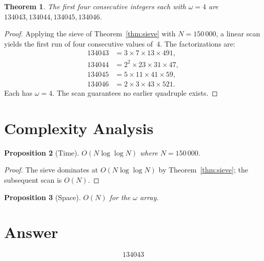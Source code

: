 \documentclass[12pt]{article}
\newtheorem{theorem}{Theorem}
\newtheorem{proposition}[theorem]{Proposition}
\begin{document}
\begin{theorem}\label{thm:answer}
The first four consecutive integers each with $\omega = 4$ are $134043, 134044, 134045, 134046$.
\end{theorem}

\begin{proof}
Applying the sieve of Theorem~\ref{thm:sieve} with $N = 150\,000$, a linear scan yields the first run of four consecutive values of~$4$. The factorizations are:
\begin{align*}
134043 &= 3 \times 7 \times 13 \times 491, \\
134044 &= 2^2 \times 23 \times 31 \times 47, \\
134045 &= 5 \times 11 \times 41 \times 59, \\
134046 &= 2 \times 3 \times 43 \times 521.
\end{align*}
Each has $\omega = 4$. The scan guarantees no earlier quadruple exists.
\end{proof}

\section{Complexity Analysis}

\begin{proposition}[Time]
$O(N \log \log N)$ where $N = 150\,000$.
\end{proposition}

\begin{proof}
The sieve dominates at $O(N \log \log N)$ by Theorem~\ref{thm:sieve}; the subsequent scan is $O(N)$.
\end{proof}

\begin{proposition}[Space]
$O(N)$ for the $\omega$ array.
\end{proposition}

\section{Answer}

\[
\boxed{134043}
\]
\end{document}
